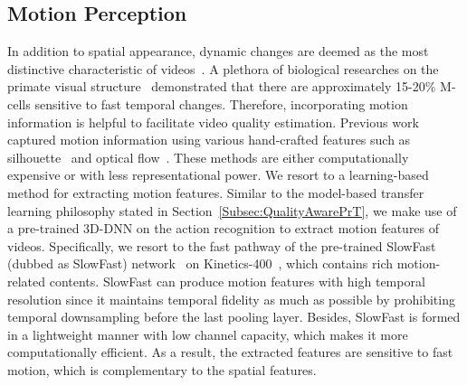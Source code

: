 \documentclass[journal]{IEEEtran}
\begin{document}
\subsection{Motion Perception}\label{subsec:motion}
In addition to spatial appearance, dynamic changes are deemed as the most distinctive characteristic of videos~\cite{kwon2020motionsqueeze}. A plethora of biological researches on the primate visual structure~\cite{livingstone1988segregation, felleman1991distributed, van1994neural} demonstrated that there are approximately 15-20\% M-cells sensitive to fast temporal changes. Therefore, incorporating motion information is helpful to facilitate video quality estimation. Previous work captured motion information using various hand-crafted features such as silhouette~\cite{blank2005actions} and optical flow~\cite{dalal2006human}. These methods are either computationally expensive or with less representational power. We resort to a learning-based method for extracting motion features. Similar to the model-based transfer learning philosophy stated in Section~\ref{Subsec:QualityAwarePrT}, we make use of a pre-trained 3D-DNN on the action recognition to extract motion features of videos. Specifically, we resort to the fast pathway of the pre-trained SlowFast (dubbed as SlowFast) network~\cite{feichtenhofer2019slowfast} on Kinetics-400~\cite{kay2017kinetics}, which contains rich motion-related contents. SlowFast can produce motion features with high temporal resolution since it maintains temporal fidelity as much as possible by prohibiting temporal downsampling before the last pooling layer. Besides, SlowFast is formed in a lightweight manner with low channel capacity, which makes it more computationally efficient. As a result, the extracted features are sensitive to fast motion, which is complementary to the spatial features.

\end{document}
